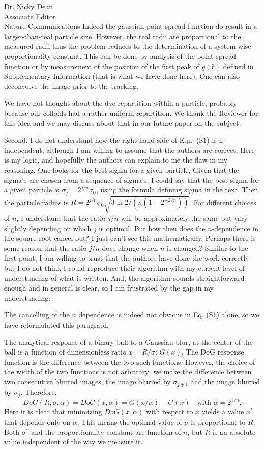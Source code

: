 \documentclass[a4paper, rebuttal, parskip=true, firsthead=false, fromemail=true, foldmarks=false]{scrlttr2}
\begin{document}
\begin{letter}{Dr. Nicky Dean\\
Associate Editor\\
Nature Communications}
Indeed the gaussian point spread function do result in a larger-than-real particle size. However, the real radii are proportional to the measured radii thus the problem reduces to the determination of a system-wise proportionality constant. This can be done by analysis of the point spread function or by measurement of the position of the first peak of $g(\hat{r})$ defined in Supplementary Information (that is what we have done here). One can also deconvolve the image prior to the tracking.

We have not thought about the dye repartition within a particle, probably because our colloids had a rather uniform repartition. We thank the Reviewer for this idea and we may discuss about that in our future paper on the subject.

\begin{quotationi}
Second, I do not understand how the right-hand side of Eqn. (S1) is n-independent, although I am willing to assume that the authors are correct. Here is my logic, and hopefully the authors can explain to me the flaw in my reasoning. One looks for the best sigma for a given particle. Given that the sigma's are chosen from a sequence of sigma's, I could say that the best sigma for a given particle is $\sigma_j = 2^{j/n} \sigma_0$, using the formula defining sigma in the text. Then the particle radius is $R = 2^{j/n} \sigma_0 \sqrt{3 \ln 2 / (n (1-2^{-2/n}))}$. For different choices of $n$, I understand that the ratio $j/n$ will be approximately the same but vary slightly depending on which $j$ is optimal. But how then does the $n$-dependence in the square root cancel out? I just can't see this mathematically. Perhaps there is some reason that the ratio $j/n$ does change when $n$ is changed? Similar to the first point, I am willing to trust that the authors have done the work correctly but I do not think I could reproduce their algorithm with my current level of understanding of what is written. And, the algorithm sounds straightforward enough and in general is clear, so I am frustrated by the gap in my understanding.
\end{quotationi}

The cancelling of the $n$ dependence is indeed not obvious in Eq. (S1) alone, so we have reformulated this paragraph.


The analytical response of a binary ball to a Gaussian blur, at the center of the ball is a function of dimensionless ratio $x=R/\sigma$: $G(x)$. The DoG response function is the difference between the two such functions. However, the choice of the width of the two functions is not arbitrary: we make the difference between two consecutive blurred images, the image blurred by $\sigma_{j+1}$ and the image blurred by $\sigma_j$. Therefore, 
\[
DoG(R,\sigma, \alpha) = DoG(x, \alpha) = G(x/\alpha) - G(x) \quad\text{with }\alpha=2^{1/n}.
\]
Here it is clear that minimizing $DoG(x, \alpha)$ with respect to $x$ yields a value $x^*$ that depends only on $\alpha$. This means the optimal value of $\sigma$ is proportional to $R$.  Both $\sigma^*$ and the proportionality constant are function of $n$, but $R$ is an absolute value independent of the way we measure it.


\end{letter}
\end{document}

